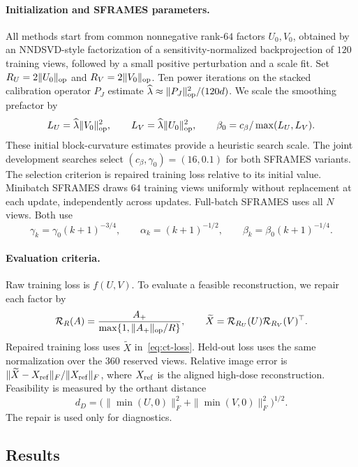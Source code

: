 \paragraph{Initialization and SFRAMES parameters.}
All methods start from common nonnegative rank-\(64\) factors \(U_0,V_0\),
obtained by an NNDSVD-style factorization of a sensitivity-normalized
backprojection of \(120\) training views, followed by a small positive
perturbation and a scale fit. Set \(R_U=2\|U_0\|_{\rm op}\) and
\(R_V=2\|V_0\|_{\rm op}\). Ten power iterations on the stacked calibration
operator \(P_J\) estimate \(\widehat\lambda\approx\|P_J\|_{\rm op}^2/(120d)\).
We scale the smoothing prefactor by
\[
 L_U=\widehat\lambda\|V_0\|_{\rm op}^2,\qquad
 L_V=\widehat\lambda\|U_0\|_{\rm op}^2,\qquad
 \beta_0=c_\beta/\max(L_U,L_V).
\]
These initial block-curvature estimates provide a heuristic search scale.
The joint development searches select \((c_\beta,\gamma_0)=(16,0.1)\) for both SFRAMES variants.
The selection criterion is repaired training loss relative to its initial
value. Minibatch SFRAMES draws \(64\) training views uniformly without
replacement at each update, independently across updates. Full-batch SFRAMES
uses all \(N\) views. Both use
\[
 \gamma_k=\gamma_0(k+1)^{-3/4},\qquad
 \alpha_k=(k+1)^{-1/2},\qquad
 \beta_k=\beta_0(k+1)^{-1/4}.
\]

\paragraph{Evaluation criteria.}
Raw training loss is \(f(U,V)\). To evaluate a feasible reconstruction, we
repair each factor by
\[
 \mathcal R_R(A)=\frac{A_+}{\max\{1,\|A_+\|_{\rm op}/R\}},\qquad
 \widetilde X=\mathcal R_{R_U}(U)\mathcal R_{R_V}(V)^\top.
\]
Repaired training loss uses \(\widetilde X\) in~\eqref{eq:ct-loss}.
Held-out loss uses the same normalization over the \(360\) reserved views.
Relative image error is \(\|\widetilde X-X_{\rm ref}\|_F/\|X_{\rm ref}\|_F\),
where \(X_{\rm ref}\) is the aligned high-dose reconstruction. Feasibility
is measured by the orthant distance
\[
 d_D=\bigl(\|\min(U,0)\|_F^2+\|\min(V,0)\|_F^2\bigr)^{1/2}.
\]
The repair is used only for diagnostics.

\subsection{Results}
\label{sec:ct-results}

